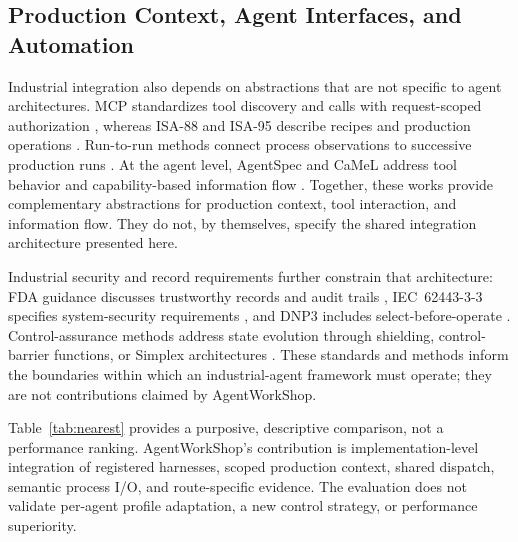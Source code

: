\subsection{Production Context, Agent Interfaces, and Automation}
Industrial integration also depends on abstractions that are not specific to
agent architectures. MCP standardizes tool discovery and calls with
request-scoped authorization \cite{mcp2024}, whereas
ISA-88 and ISA-95 describe recipes and production operations
\cite{isa88_2010,isa95_2025}. Run-to-run methods connect process observations
to successive production runs \cite{moyne2000r2r}. At the agent level,
AgentSpec and CaMeL address tool behavior and capability-based information
flow \cite{wang2025agentspec,debenedetti2025camel}. Together, these works
provide complementary abstractions for production context, tool interaction,
and information flow. They do not, by themselves, specify the shared
integration architecture presented here.

Industrial security and record requirements further constrain that
architecture: FDA guidance discusses trustworthy records and audit trails
\cite{part11}, IEC~62443-3-3 specifies system-security requirements
\cite{iec62443-3-3}, and DNP3 includes select-before-operate
\cite{ieee1815dnp3}. Control-assurance methods address state evolution through
shielding, control-barrier functions, or Simplex architectures
\cite{alshiekh2018shielding,ames2017cbf,sha2001simplex}. These standards and
methods inform the boundaries within which an industrial-agent framework must
operate; they are not contributions claimed by AgentWorkShop.

Table~\ref{tab:nearest} provides a purposive, descriptive comparison, not a
performance ranking. AgentWorkShop's contribution is implementation-level
integration of registered harnesses, scoped production context, shared
dispatch, semantic process I/O, and route-specific evidence. The evaluation
does not validate per-agent profile adaptation, a new control strategy, or
performance superiority.

